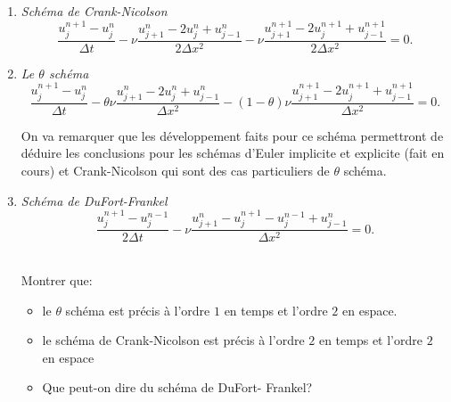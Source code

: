 \documentclass[12pt,a4paper]{article}
\begin{document}
\begin{enumerate}
%

\item {\it Sch\'ema de Crank-Nicolson}
$$
\frac{u_j^{n+1}-u_j^n}{\Delta t}-\nu \frac{u_{j+1}^{n}-2u_j^n+u_{j-1}^{n}}{2\Delta x^2}-\nu \frac{u_{j+1}^{n+1}-2u_j^{n+1}+u_{j-1}^{n+1}}{2\Delta x^2}=0.
$$

\item {\it Le $\theta$ sch\'ema}
$$
\frac{u_j^{n+1}-u_j^n}{\Delta t}-\theta\nu \frac{u_{j+1}^{n}-2u_j^n+u_{j-1}^{n}}{\Delta x^2}-(1-\theta)\nu \frac{u_{j+1}^{n+1}-2u_j^{n+1}+u_{j-1}^{n+1}}{\Delta x^2}=0.
$$

On va remarquer que les développement faits pour ce schéma permettront de déduire les conclusions pour les schémas d'Euler implicite et explicite (fait en cours) et Crank-Nicolson qui sont des cas particuliers de $\theta$ schéma.

\item {\it Sch\'ema de DuFort-Frankel}
$$
\frac{u_j^{n+1}-u_j^{n-1}}{2\Delta t}-\nu \frac{u_{j+1}^{n}-u_j^{n+1}-u_j^{n-1}+u_{j-1}^{n}}{\Delta x^2}=0.
$$

\newpage
{}\\
Montrer que:
\begin{itemize}
\item  le $\theta$ sch\'ema est pr\'ecis à l'ordre
$1$ en temps et l'ordre $2$ en espace.
\item le sch\'ema de Crank-Nicolson
est pr\'ecis à l'ordre $2$ en temps et l'ordre $2$
en espace
\item Que peut-on dire du sch\'ema de
DuFort- Frankel?
\end{itemize}


\end{enumerate}
\end{document}
